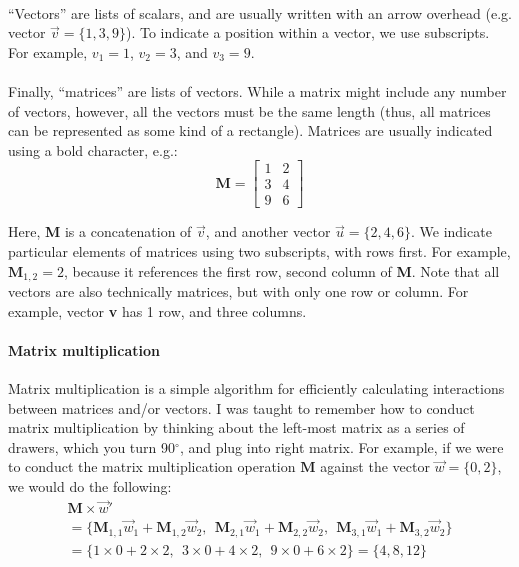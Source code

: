 \documentclass[12pt]{article}
\begin{document}
\paragraph{} ``Vectors'' are lists of scalars, and are usually written with an arrow overhead (e.g. vector $\overrightarrow{v} = \{1,3,9\}$). To indicate a position within a vector, we use subscripts. For example, $v_{1} = 1$, $v_{2} = 3$, and $v_{3} = 9$.

\paragraph{} Finally, ``matrices'' are lists of vectors. While a matrix might include any number of vectors, however, all the vectors must be the same length (thus, all matrices can be represented as some kind of a rectangle). Matrices are usually indicated using a bold character, e.g.:
\begin{equation}
\textbf{M} =
\begin{bmatrix}
1 & 2\\
3 & 4\\
9 & 6
\end{bmatrix}
\end{equation}

Here, \textbf{M} is a concatenation of $\overrightarrow{v}$, and another vector $\overrightarrow{u} = \{2, 4, 6\}$. We indicate particular elements of matrices using two subscripts, with rows first. For example, $\textbf{M}_{1,2} = 2$, because it references the first row, second column of \textbf{M}. Note that all vectors are also technically matrices, but with only one row or column. For example, vector \textbf{v} has 1 row, and three columns.

\paragraph{Matrix multiplication} Matrix multiplication is a simple algorithm for efficiently calculating interactions between matrices and/or vectors. I was taught to remember how to conduct matrix multiplication by thinking about the left-most matrix as a series of drawers, which you turn 90$^{\circ}$, and plug into right matrix. For example, if we were to conduct the matrix multiplication operation $\textbf{M}$ against the vector $\overrightarrow{w} = \{0,2\}$, we would do the following:
\begin{equation}
\begin{split}
\textbf{M}\times\overrightarrow{w}'\\
= \{\textbf{M}_{1,1}\overrightarrow{w}_{1}+\textbf{M}_{1,2}\overrightarrow{w}_{2}, ~~ \textbf{M}_{2,1}\overrightarrow{w}_{1}+\textbf{M}_{2,2}\overrightarrow{w}_{2}, ~~ \textbf{M}_{3,1}\overrightarrow{w}_{1}+\textbf{M}_{3,2}\overrightarrow{w}_{2}\}\\
= \{1\times0 + 2\times2, ~~ 3\times0 + 4\times2, ~~ 9\times0 + 6\times2\}
= \{4,8,12\}\
\end{split}
\end{equation}
\end{document}
